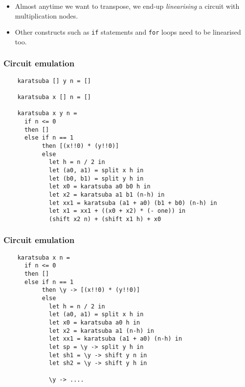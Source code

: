 \documentclass[10pt]{beamer}
\begin{document}
\begin{frame}
\begin{center}
  \end{center}

  \begin{itemize}
  \item Almost anytime we want to transpose, we end-up
    \emph{linearising} a circuit with multiplication nodes.
  \item Other constructs such as \texttt{if} statements and
    \texttt{for} loops need to be linearised too.
  \end{itemize}
\end{frame}


\begin{frame}[fragile]
  \frametitle{Circuit emulation}

  \begin{lstlisting}
    karatsuba [] y n = []

    karatsuba x [] n = []

    karatsuba x y n =
      if n <= 0
      then []
      else if n == 1 
           then [(x!!0) * (y!!0)]
           else 
             let h = n / 2 in
             let (a0, a1) = split x h in
             let (b0, b1) = split y h in
             let x0 = karatsuba a0 b0 h in
             let x2 = karatsuba a1 b1 (n-h) in
             let xx1 = karatsuba (a1 + a0) (b1 + b0) (n-h) in
             let x1 = xx1 + ((x0 + x2) * (- one)) in
             (shift x2 n) + (shift x1 h) + x0
  \end{lstlisting}
\end{frame}


\begin{frame}[fragile]
  \frametitle{Circuit emulation}

  \begin{lstlisting}
    karatsuba x n =
      if n <= 0
      then []
      else if n == 1 
           then \y -> [(x!!0) * (y!!0)]
           else 
             let h = n / 2 in
             let (a0, a1) = split x h in
             let x0 = karatsuba a0 h in
             let x2 = karatsuba a1 (n-h) in
             let xx1 = karatsuba (a1 + a0) (n-h) in
             let sp = \y -> split y h in
             let sh1 = \y -> shift y n in
             let sh2 = \y -> shift y h in

             \y -> .... 
  \end{lstlisting}
\end{frame}
\end{document}
